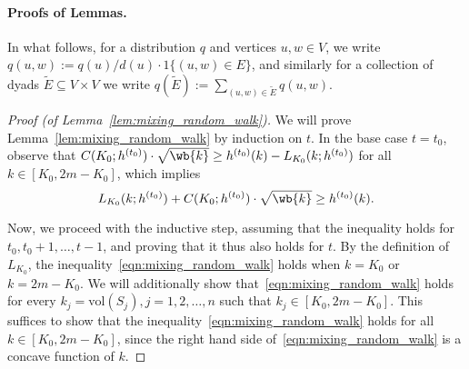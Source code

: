\documentclass{article}
\newcommand{\vol}{\mathrm{vol}}
\newcommand{\1}{\mathbf{1}}
\newcommand{\wt}[1]{\widetilde{#1}}
\theoremstyle{definition}
\theoremstyle{remark}
\begin{document}
\paragraph{Proofs of Lemmas.}
In what follows, for a distribution $q$ and vertices $u,w \in V$, we write $q(u,w) := q(u)/d(u) \cdot 1\{(u,w) \in E\}$, and similarly for a collection of dyads $\wt{E} \subseteq V \times V$ we write $q(\wt{E}) := \sum_{(u,w) \in \wt{E}} q(u,w)$. 
\begin{proof}[Proof (of Lemma~\ref{lem:mixing_random_walk})]
	 We will prove Lemma~\ref{lem:mixing_random_walk} by induction on $t$. In the base case $t = t_0$, observe that $C(K_0;h^{(t_0)}) \cdot \sqrt{\wb{k}} \geq h^{(t_0)}(k) - L_{K_0}(k;h^{(t_0)})$ for all $k \in [K_0, 2m - K_0]$, which implies 
	\begin{equation*}
	L_{K_0}(k;h^{(t_0)}) + C(K_0; h^{(t_0)}) \cdot \sqrt{\wb{k}} \geq h^{(t_0)}(k).
	\end{equation*}
	
	Now, we proceed with the inductive step, assuming that the inequality holds for $t_0,t_0 + 1,\ldots,t - 1$, and proving that it thus also holds for $t$. By the definition of $L_{K_0}$, the inequality~\eqref{eqn:mixing_random_walk} holds when $k = K_0$ or $k = 2m - K_0$. We will additionally show that~\eqref{eqn:mixing_random_walk} holds for every $k_j = \vol(S_j), j = 1,2,\ldots,n$ such that $k_j \in [K_0, 2m - K_0]$. This suffices to show that the inequality~\eqref{eqn:mixing_random_walk} holds for all $k \in [K_0,2m - K_0]$, since the right hand side of~\eqref{eqn:mixing_random_walk} is a concave function of $k$.
	

\end{proof}
\end{document}

